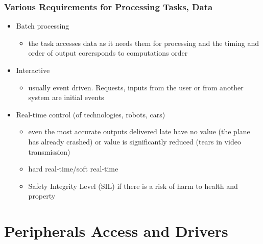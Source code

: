 \documentclass{beamer}
\begin{document}
\begin{frame}
\frametitle{Various Requirements for Processing Tasks, Data}

\begin{itemize}
 \item Batch processing
 \begin{itemize}
  \item the task accesses data as it needs them for processing and the timing and order of output corersponds to computations order
 \end{itemize}
 \item Interactive
 \begin{itemize}
  \item usually event driven. Requests, inputs from the user or from another system are initial events
 \end{itemize}
 \item Real-time control (of technologies, robots, cars)
 \begin{itemize}
  \item even the most accurate outputs delivered late have no value (the plane has already crashed) or value is significantly reduced (tears in video transmission)
  \item hard real-time/soft real-time
  \item Safety Integrity Level (SIL) if there is a risk of harm to health and property
 \end{itemize}

\end{itemize}
\end{frame}

\section{Peripherals Access and Drivers}
\end{document}
